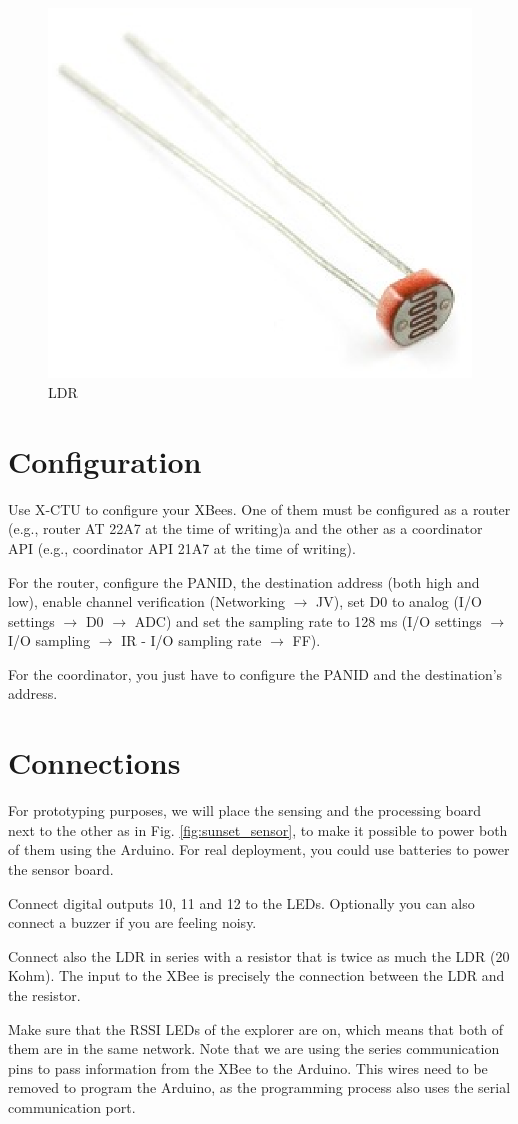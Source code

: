 \begin{figure}[htbp]
  \centering
  \includegraphics[width=0.3\linewidth]{figures/ldr.eps}
  \caption{LDR}
  \label{fig:blinkingLEDLayout}
\end{figure}

\section{Configuration}
Use X-CTU to configure your XBees.
One of them must be configured as a router (e.g., router AT 22A7 at the time of writing)a and the other as a coordinator API (e.g., coordinator API 21A7 at the time of writing).

For the router, configure the PANID, the destination address (both high and low), enable channel verification (Networking $\rightarrow$  JV), set D0 to analog (I/O settings $\rightarrow$  D0 $\rightarrow$  ADC) and set the sampling rate to 128 ms (I/O settings $\rightarrow$  I/O sampling $\rightarrow$  IR - I/O sampling rate $\rightarrow$  FF).

For the coordinator, you just have to configure the PANID and the destination's address.

\section{Connections}

For prototyping purposes, we will place the sensing and the processing board next to the other as in Fig. \ref{fig:sunset_sensor}, to make it possible to power both of them using the Arduino.
For real deployment, you could use batteries to power the sensor board.

Connect digital outputs 10, 11 and 12 to the LEDs.
Optionally you can also connect a buzzer if you are feeling noisy.

Connect also the LDR in series with a resistor that is twice as much the LDR (20 Kohm).
The input to the XBee is precisely the connection between the LDR and the resistor.

Make sure that the RSSI LEDs of the explorer are on, which means that both of them are in the same network.
Note that we are using the series communication pins to pass information from the XBee to the Arduino.
This wires need to be removed to program the Arduino, as the programming process also uses the serial communication port.



